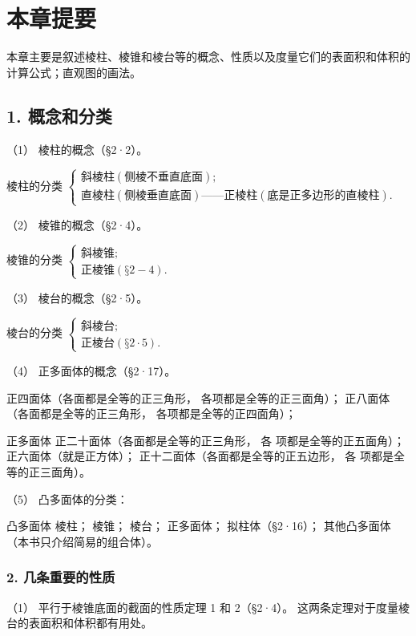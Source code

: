 \section{本章提要}

本章主要是叙述棱柱、棱锥和棱台等的概念、性质以及度量它们的表面积和体积的计算公式；直观图的画法。

\subsection{1. 概念和分类}

（1） 棱柱的概念（§2·2）。

棱柱的分类
\(\left\{\begin{array}{l} \text{斜棱柱}(\text{侧棱不垂直底面}); \\ \text{直棱柱}(\text{侧棱垂直底面})——\text{正棱柱}(\text{底是正多边形的直棱柱}). \end{array}\right.\)

（2） 棱锥的概念（§2·4）。

棱锥的分类
\(\left\{\begin{array}{l} \text{斜棱锥}; \\ \text{正棱锥}(\text{§}2-4). \end{array}\right.\)

（3） 棱台的概念（§2·5）。

棱台的分类
\(\left\{\begin{array}{l} \text{斜棱台}; \\ \text{正棱台}(\text{§}2\cdot5). \end{array}\right.\)

（4） 正多面体的概念（§2·17）。

正四面体（各面都是全等的正三角形， 各项都是全等的正三面角）；
正八面体（各面都是全等的正三角形， 各项都是全等的正四面角）；

正多面体 正二十面体（各面都是全等的正三角形， 各
项都是全等的正五面角）； 正六面体（就是正方体）；
正十二面体（各面都是全等的正五边形， 各 项都是全等的正三面角）。

（5） 凸多面体的分类：

凸多面体 棱柱； 棱锥； 棱台； 正多面体； 拟柱体（§2·16）；
其他凸多面体（本书只介绍简易的组合体）。

\subsubsection{2.
几条重要的性质}

（1） 平行于棱锥底面的截面的性质定理 1 和 2（§2·4）。
这两条定理对于度量棱台的表面积和体积都有用处。

